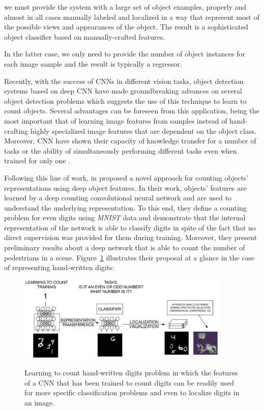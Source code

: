 we must provide the system with a large set of object examples, properly and almost in all cases manually labeled and localized in a way that represent most of the possible views and appearances of the object. The result is a sophisticated object classifier based on manually-crafted features\cite{viola2004robust, viola2005detecting}. 

In the latter case, we only need to provide the number of object instances for each image sample and the result is typically a regressor\cite{lempitsky2010learning}.  

Recently, with the success of CNNs in different vision tasks, object detection systems based on deep CNN have made groundbreaking advances on several object detection problems\cite{zhang2015improving, erhan2014scalable, girshick2014rich, he2015spatial, erhan2014scalable} which suggests the use of this technique to learn to count objects. Several advantages can be foreseen from this application, being the most important that of learning image features from samples instead of hand-crafting highly specialized image features that are dependent on the object class\cite{segui2015learning}. Moreover, CNN have shown their capacity of knowledge transfer for a number of tasks or the ability of simultaneously performing different tasks even when trained for only one \cite{zhou2014learning}. 

Following this line of work,  in \cite{segui2015learning} proposed a novel approach for counting objects' representations using deep object features. In their work, objects' features are learned by a deep counting convolutional neural network and are used to understand the underlying representation. To this end, they define a counting problem for even digits using \textit{MNIST} data and demonstrate that the internal representation of the network is able to classify digits in spite of the fact that no direct supervision was provided for them during training. Moreover, they present preliminary results about a deep network that is able to count the number of pedestrians in a scene\cite{segui2015learning}. Figure~\ref{fig:santimnist} illustrates their proposal at a glance in the case of representing hand-written digits:
\begin{figure}[h!]
	\centering
	{\includegraphics[width=0.9\textwidth]{images/santimnist}}
	\caption{Learning to count hand-written digits problem in which the features of a CNN that has been trained to count digits can be readily used for more specific classification problems and even to localize digits in an image\cite{segui2015learning}.}
	\label{fig:santimnist}
\end{figure}


